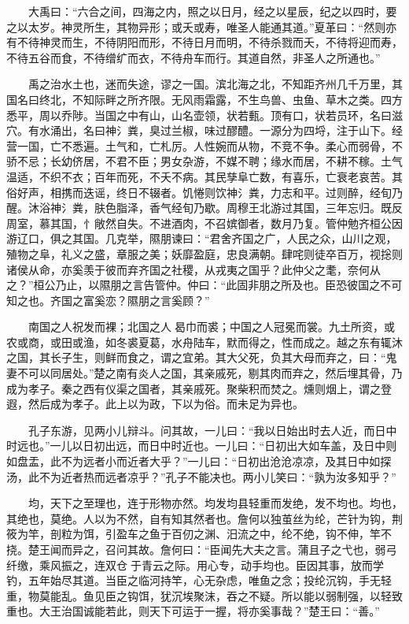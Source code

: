 　　大禹曰：``六合之间，四海之内，照之以日月，经之以星辰，纪之以四时，要之以太岁。神灵所生，其物异形；或夭或寿，唯圣人能通其道。''夏革曰：``然则亦有不待神灵而生，不待阴阳而形，不待日月而明，不待杀戮而夭，不待将迎而寿，不待五谷而食，不待缯纩而衣，不待舟车而行。其道自然，非圣人之所通也。''

　　禹之治水土也，迷而失途，谬之一国。滨北海之北，不知距齐州几千万里，其国名曰终北，不知际畔之所齐限。无风雨霜露，不生鸟兽、虫鱼、草木之类。四方悉平，周以乔陟。当国之中有山，山名壶领，状若甀。顶有口，状若员环，名曰滋穴。有水涌出，名曰神氵粪，臭过兰椒，味过醪醴。一源分为四埒，注于山下。经营一国，亡不悉遍。土气和，亡札厉。人性婉而从物，不竞不争。柔心而弱骨，不骄不忌；长幼侪居，不君不臣；男女杂游，不媒不聘；缘水而居，不耕不稼。土气温适，不织不衣；百年而死，不夭不病。其民孳阜亡数，有喜乐，亡衰老哀苦。其俗好声，相携而迭谣，终日不辍者。饥惓则饮神氵粪，力志和平。过则醉，经旬乃醒。沐浴神氵粪，肤色脂泽，香气经旬乃歇。周穆王北游过其国，三年忘归。既反周室，慕其国，忄敞然自失。不进酒肉，不召嫔御者，数月乃复。管仲勉齐桓公因游辽口，俱之其国。几克举，隰朋谏曰：``君舍齐国之广，人民之众，山川之观，殖物之阜，礼义之盛，章服之美；妖靡盈庭，忠良满朝。肆咤则徒卒百万，视捴则诸侯从命，亦奚羡于彼而弃齐国之社稷，从戎夷之国乎？此仲父之耄，奈何从之？''桓公乃止，以隰朋之言告管仲。仲曰：``此固非朋之所及也。臣恐彼国之不可知之也。齐国之富奚恋？隰朋之言奚顾？''

　　南国之人祝发而裸；北国之人曷巾而裘；中国之人冠冕而裳。九土所资，或农或商，或田或渔，如冬裘夏葛，水舟陆车，默而得之，性而成之。越之东有辄沐之国，其长子生，则鲜而食之，谓之宜弟。其大父死，负其大母而弃之，曰：``鬼妻不可以同居处。''楚之南有炎人之国，其亲戚死，剔其肉而弃之，然后埋其骨，乃成为孝子。秦之西有仪渠之国者，其亲戚死。聚柴积而焚之。燻则烟上，谓之登遐，然后成为孝子。此上以为政，下以为俗。而未足为异也。

　　孔子东游，见两小儿辩斗。问其故，一儿曰：``我以日始出时去人近，而日中时远也。''一儿以日初出远，而日中时近也。一儿曰：``日初出大如车盖，及日中则如盘盂，此不为远者小而近者大乎？''一儿曰：``日初出沧沧凉凉，及其日中如探汤，此不为近者热而远者凉乎？''孔子不能决也。两小儿笑曰：``孰为汝多知乎？''

　　均，天下之至理也，连于形物亦然。均发均县轻重而发绝，发不均也。均也，其绝也，莫绝。人以为不然，自有知其然者也。詹何以独茧丝为纶，芒针为钩，荆筱为竿，剖粒为饵，引盈车之鱼于百仞之渊、汨流之中，纶不绝，钩不伸，竿不挠。楚王闻而异之，召问其故。詹何曰：``臣闻先大夫之言。蒲且子之弋也，弱弓纤缴，乘风振之，连双仓于青云之际。用心专，动手均也。臣因其事，放而学钓，五年始尽其道。当臣之临河持竿，心无杂虑，唯鱼之念；投纶沉钩，手无轻重，物莫能乱。鱼见臣之钩饵，犹沉埃聚沫，吞之不疑。所以能以弱制强，以轻致重也。大王治国诚能若此，则天下可运于一握，将亦奚事哉？''楚王曰：``善。''

